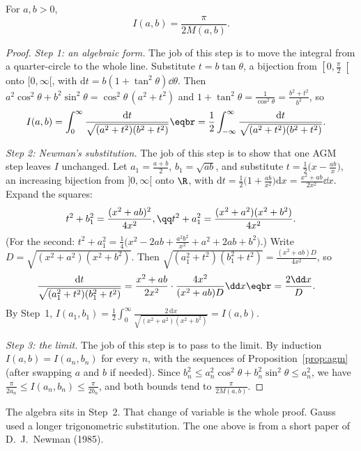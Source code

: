 \begin{theorem}[Gauss, 1799]\label{thm:gaussagm}
For $a,b>0$,
\[
I(a,b)=\frac\pi{2M(a,b)}.
\]
\end{theorem}
\begin{proof}
\emph{Step 1: an algebraic form.} The job of this step is to move the integral from a quarter-circle to the whole line. Substitute $t=b\tan\theta$, a bijection from $\left[0,\frac\pi2\right[$ onto $[0,\infty[$, with $\mathrm dt=b(1+\tan^2\theta)\dd\theta$.
Then $a^2\cos^2\theta+b^2\sin^2\theta=\cos^2\theta\,(a^2+t^2)$ and $1+\tan^2\theta=\frac1{\cos^2\theta}=\frac{b^2+t^2}{b^2}$, so
\[
\begin{aligned}I(a,b)&=\int_0^\infty\frac{\mathrm dt}{\sqrt{(a^2+t^2)(b^2+t^2)}}\eqbr=\frac12\int_{-\infty}^{\infty}\frac{\mathrm dt}{\sqrt{(a^2+t^2)(b^2+t^2)}}.\end{aligned}
\]

\emph{Step 2: Newman's substitution.} The job of this step is to show that one AGM step leaves $I$ unchanged. Let $a_1=\frac{a+b}2$, $b_1=\sqrt{ab}$, and substitute $t=\frac12\bigl(x-\frac{ab}x\bigr)$, an increasing bijection from $]0,\infty[$
onto $\R$, with $\mathrm dt=\frac12\bigl(1+\frac{ab}{x^2}\bigr)\mathrm dx=\frac{x^2+ab}{2x^2}\dd x$. Expand the squares:
\[
\begin{gathered}t^2+b_1^2=\frac{(x^2+ab)^2}{4x^2},\qq t^2+a_1^2=\frac{(x^2+a^2)(x^2+b^2)}{4x^2}.\end{gathered}
\]
(For the second: $t^2+a_1^2=\frac14\bigl(x^2-2ab+\frac{a^2b^2}{x^2}+a^2+2ab+b^2\bigr)$.) Write $D=\sqrt{(x^2+a^2)(x^2+b^2)}$. Then
$\sqrt{(a_1^2+t^2)(b_1^2+t^2)}=\frac{(x^2+ab)D}{4x^2}$, so
\[
\begin{aligned}\frac{\mathrm dt}{\sqrt{(a_1^2+t^2)(b_1^2+t^2)}}&=\frac{x^2+ab}{2x^2}\cdot\frac{4x^2}{(x^2+ab)D}\dd x\eqbr=\frac{2\dd x}D.\end{aligned}
\]
By Step~1, $I(a_1,b_1)=\frac12\int_0^\infty\frac{2\,\mathrm dx}{\sqrt{(x^2+a^2)(x^2+b^2)}}=I(a,b)$.

\emph{Step 3: the limit.} The job of this step is to pass to the limit. By induction $I(a,b)=I(a_n,b_n)$ for every $n$, with the sequences of Proposition~\ref{prop:agm} (after swapping $a$ and $b$ if
needed). Since $b_n^2\le a_n^2\cos^2\theta+b_n^2\sin^2\theta\le a_n^2$, we have $\frac\pi{2a_n}\le I(a_n,b_n)\le\frac\pi{2b_n}$, and both bounds tend to $\frac\pi{2M(a,b)}$.
\end{proof}

The algebra sits in Step~2. That change of variable is the whole proof. Gauss used a longer trigonometric substitution. The one above is from a short paper of D.~J.~Newman (1985).

